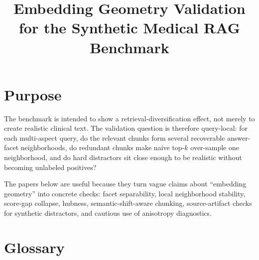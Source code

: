 \documentclass[11pt,a4paper]{article}
\author{}
\title{\textbf{Embedding Geometry Validation for the Synthetic Medical RAG Benchmark}}
\date{}
\begin{document}
\maketitle

\section{Purpose}

The benchmark is intended to show a retrieval-diversification effect, not merely to create realistic clinical text. The validation question is therefore query-local: for each multi-aspect query, do the relevant chunks form several recoverable answer-facet neighborhoods, do redundant chunks make naive top-$k$ over-sample one neighborhood, and do hard distractors sit close enough to be realistic without becoming unlabeled positives?

The papers below are useful because they turn vague claims about ``embedding geometry'' into concrete checks: facet separability, local neighborhood stability, score-gap collapse, hubness, semantic-shift-aware chunking, source-artifact checks for synthetic distractors, and cautious use of anisotropy diagnostics.

\section{Glossary}
\end{document}
